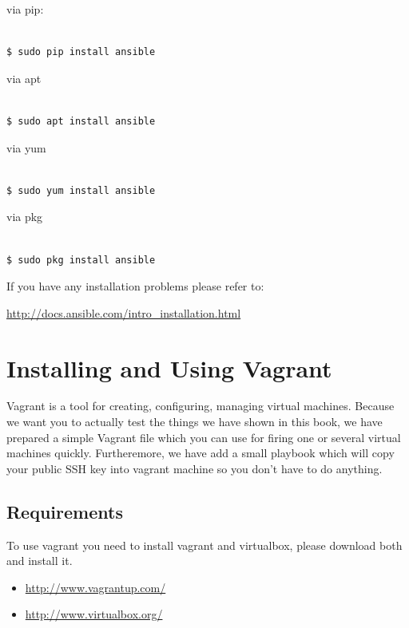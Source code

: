 \documentclass[10pt]{book}
\begin{document}
\begin{appendices}
via pip:

\begin{Verbatim}

$ sudo pip install ansible

\end{Verbatim}

via apt

\begin{Verbatim}

$ sudo apt install ansible

\end{Verbatim}

via yum

\begin{Verbatim}

$ sudo yum install ansible

\end{Verbatim}


via pkg

\begin{Verbatim}

$ sudo pkg install ansible

\end{Verbatim}

If you have any installation problems please refer to:

\url{http://docs.ansible.com/intro_installation.html}


\chapter{Installing and Using Vagrant }
\label{appendix:installing-and-using-vagrant}
Vagrant is a tool for creating, configuring, managing virtual 
machines. Because we want you to actually test the things we have shown in this 
book, we have prepared a simple Vagrant file which you can use 
for firing one or several virtual machines quickly. Furtheremore, we have add a 
small playbook which will copy your public SSH key into vagrant machine so you 
don't have to do anything.


\section{Requirements}
To use vagrant you need to install vagrant and virtualbox, please download both 
and install it.

\begin{itemize}
\item \url{http://www.vagrantup.com/}
\item \url{http://www.virtualbox.org/}
\end{itemize}


\end{appendices}
\end{document}
